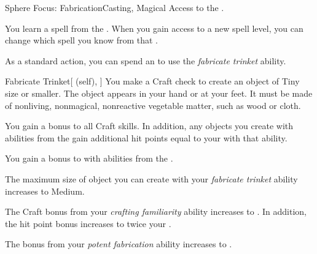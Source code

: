    \begin{feat}{Sphere Focus: Fabrication}{Casting, Magical}
        \featpre Access to the  .

         You learn a spell from the  .
        When you gain access to a new spell level, you can change which spell you know from that .

         As a standard action, you can spend an  to use the \textit{fabricate trinket} ability.
        \begin{ability}{Fabricate Trinket}[ (self), ]
            You make a Craft check to create an object of Tiny size or smaller.
            The object appears in your hand or at your feet.
            It must be made of nonliving, nonmagical, nonreactive vegetable matter, such as wood or cloth.
        \end{ability}

         You gain a  bonus to all Craft skills.
        In addition, any objects you create with abilities from the   gain additional hit points equal to your  with that ability.

         You gain a  bonus to  with abilities from the  .

         The maximum size of object you can create with your \textit{fabricate trinket} ability increases to Medium.

         The Craft bonus from your \textit{crafting familiarity} ability increases to .
        In addition, the hit point bonus increases to twice your .

         The bonus from your \textit{potent fabrication} ability increases to .
    \end{feat}

